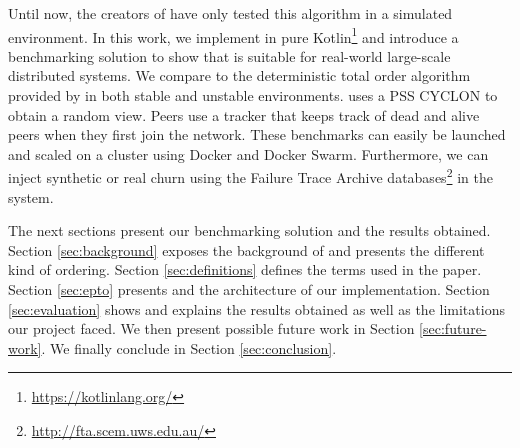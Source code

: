 Until now, the creators of \epto have only tested this algorithm in a simulated environment. In this work, we implement \epto in pure Kotlin\footnote{\href{https://kotlinlang.org/}{https://kotlinlang.org/}} and introduce a benchmarking solution to show that \epto is suitable for real-world large-scale distributed systems. We compare \epto to the deterministic total order algorithm provided by \jgroups \autocite{jgroups} in both stable and unstable environments. \epto uses a PSS CYCLON \autocite{Voulgaris2005} to obtain a random view. Peers use a tracker that keeps track of dead and alive peers when they first join the network. These benchmarks can easily be launched and scaled on a cluster using Docker and Docker Swarm. Furthermore, we can inject synthetic or real churn using the Failure Trace Archive databases\footnote{\href{http://fta.scem.uws.edu.au/}{http://fta.scem.uws.edu.au/}} in the system.
\par
The next sections present our benchmarking solution and the results obtained. Section \ref{sec:background} exposes the background of \eptotester and presents the different kind of ordering. Section \ref{sec:definitions} defines the terms used in the paper. Section \ref{sec:epto} presents \epto and the architecture of our implementation. Section \ref{sec:evaluation} shows and explains the results obtained as well as the limitations our project faced. We then present possible future work in Section \ref{sec:future-work}. We finally conclude in Section \ref{sec:conclusion}.
